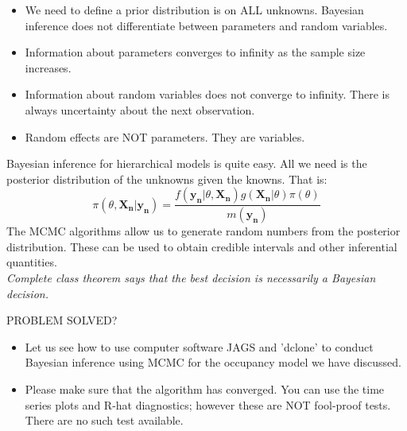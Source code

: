 \documentclass[10pt]{beamer}
\begin{document}
\begin{frame}
\begin{itemize}
\item We need to define a prior distribution is on ALL unknowns. Bayesian inference does not differentiate between parameters and random variables. 
\item Information about parameters converges to infinity as the sample size increases.
\item Information about random variables does not converge to infinity. There is always uncertainty about the next observation. 
\item Random effects are NOT parameters. They are variables. 
\end{itemize}
\end{frame}

\begin{frame}
Bayesian inference for hierarchical models is quite easy. All we need is the posterior distribution of the unknowns given the knowns. That is:
\begin{equation}
\pi(\theta,\mathbf{X_n}|\mathbf{y_n})=\frac{f(\mathbf{y_n}|\theta,\mathbf{X_n})g(\mathbf{X_n}|\theta)\pi(\theta)}{m(\mathbf{y_n})}
\end{equation}
The MCMC algorithms allow us to generate random numbers from the posterior distribution. These can be used to obtain credible intervals and other inferential quantities.\\
\vspace{5mm}
\textit{Complete class theorem says that the best decision is necessarily a Bayesian decision.}
\pause
\begin{center}
\alert {\LARGE PROBLEM SOLVED?}
\end{center}
\end{frame}

\begin{frame}
\begin{itemize}
\item Let us see how to use computer software JAGS and 'dclone' to conduct Bayesian inference using MCMC for the occupancy model we have discussed.
\pause
\item Please make sure that the algorithm has converged. You can use the time series plots and R-hat diagnostics; however these are NOT fool-proof tests. There are no such test available.
\end{itemize}
\end{frame}
\end{document}
